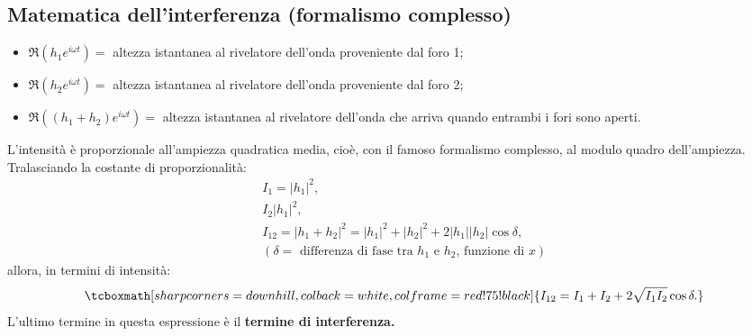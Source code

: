 \subsection*{Matematica dell'interferenza (formalismo complesso)}
\begin{itemize}
\item $\Re{\left(h_1 e^{i\omega t} \right)}=$ altezza istantanea al rivelatore dell'onda proveniente dal foro 1;
\item $\Re{\left(h_2 e^{i\omega t} \right)}=$ altezza istantanea al rivelatore dell'onda proveniente dal foro 2;
\item $\Re{\left( \left(h_1 +h_2 \right) e^{i\omega t} \right)}=$ altezza istantanea al rivelatore dell'onda che arriva quando entrambi i fori sono aperti.
\end{itemize}
L'intensità è proporzionale all'ampiezza quadratica media, cioè, con il famoso formalismo complesso, al modulo quadro dell'ampiezza. Tralasciando la costante di proporzionalità:
\begin{eqnarray}
& &I_1= \lvert {h_1} \rvert ^2, \nonumber \\
& &I_2 \lvert {h_1} \rvert ^2, \\
& &I_{12}= \lvert {h_1+h_2} \rvert ^2= \lvert {h_1} \rvert ^2+ \lvert {h_2} \rvert ^2 + 2 \lvert {h_1} \rvert \lvert {h_2} \rvert \cos \delta ,\nonumber  \\ 
& &\left( \delta = \textrm{ differenza di fase tra } h_1 \textrm{ e } h_2 \textrm{, funzione di }x \right)\nonumber 
\end{eqnarray}
allora, in termini di intensità:
	\begin{equation}
		\tcboxmath[sharp corners=downhill ,colback=white,colframe=red!75!black]{
			I_{12}= I_1 + I_2 + 2 \sqrt{I_1 I_2}\cos \delta.
			}
	\end{equation}
L'ultimo termine in questa espressione è il \textbf{termine di interferenza.}
